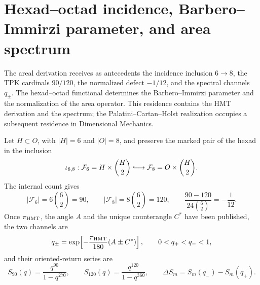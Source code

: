 \section{Hexad--octad incidence, Barbero--Immirzi parameter, and area spectrum}
\label{sec:l9s102:barbero-area}

The areal derivation receives as antecedents the incidence inclusion
\(6\to8\), the TPK cardinals \(90/120\), the normalized defect
\(-1/12\), and the spectral channels \(q_\pm\). The
hexad--octad functional determines the Barbero--Immirzi parameter and the
normalization of the area operator. This residence contains the HMT derivation
and the spectrum; the Palatini--Cartan--Holst realization occupies a subsequent
residence in Dimensional Mechanics.

Let \(H\subset O\), with \(|H|=6\) and \(|O|=8\), and preserve the marked
pair of the hexad in the inclusion
\begin{equation}
 \iota_{6,8}:\mathcal F_6=H\times\binom H2
 \lhook\joinrel\longrightarrow
 \mathcal F_8=O\times\binom H2.
 \label{eq:l9s102:barbero-inclusion-incidencia}
\end{equation}
The internal count gives
\begin{equation}
 |\mathcal F_6|=6\binom62=90,
 \qquad |\mathcal F_8|=8\binom62=120,
 \qquad
 \frac{90-120}{24\binom62}=-\frac1{12}.
 \label{eq:l9s102:barbero-conteos}
\end{equation}
Once \(\pi_{\rm HMT}\), the angle \(A\) and the
unique counterangle \(C^*\) have been published, the two channels are
\begin{equation}
 q_\pm=\exp\!\left[-\frac{\pi_{\rm HMT}}{180}(A\pm C^*)\right],
 \qquad 0<q_+<q_-<1,
 \label{eq:l9s102:barbero-qpm}
\end{equation}
and their oriented-return series are
\begin{equation}
 S_{90}(q)=\frac{q^{90}}{1-q^{270}},\qquad
 S_{120}(q)=\frac{q^{120}}{1-q^{360}},\qquad
 \Delta S_m=S_m(q_-)-S_m(q_+).
 \label{eq:l9s102:barbero-series}
\end{equation}

